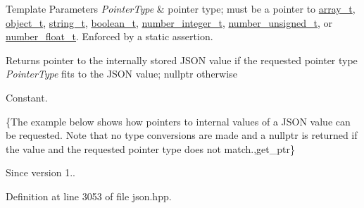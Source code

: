\begin{DoxyTemplParams}{Template Parameters}
{\em Pointer\+Type} & pointer type; must be a pointer to \hyperlink{classnlohmann_1_1basic__json_ab00b882d39306d663c23dab110f5cae0}{array\+\_\+t}, \hyperlink{classnlohmann_1_1basic__json_a0ac9894c9de8dc551cf2e5f1c605537f}{object\+\_\+t}, \hyperlink{classnlohmann_1_1basic__json_ab63e618bbb0371042b1bec17f5891f42}{string\+\_\+t}, \hyperlink{classnlohmann_1_1basic__json_af3bc3e83aa162d7ba4df16a949872723}{boolean\+\_\+t}, \hyperlink{classnlohmann_1_1basic__json_ac4b10b2364f26ce47bdb9a413ff04a59}{number\+\_\+integer\+\_\+t}, \hyperlink{classnlohmann_1_1basic__json_a60a04166c122072ab11eaf9845d9cd1d}{number\+\_\+unsigned\+\_\+t}, or \hyperlink{classnlohmann_1_1basic__json_a74a0013e847fdc574b48f931f0e757e1}{number\+\_\+float\+\_\+t}. Enforced by a static assertion.\\
\hline
\end{DoxyTemplParams}
\begin{DoxyReturn}{Returns}
pointer to the internally stored J\+S\+O\+N value if the requested pointer type {\itshape Pointer\+Type} fits to the J\+S\+O\+N value; {\ttfamily nullptr} otherwise
\end{DoxyReturn}
Constant.

\{The example below shows how pointers to internal values of a J\+S\+O\+N value can be requested. Note that no type conversions are made and a {\ttfamily nullptr} is returned if the value and the requested pointer type does not match.,get\+\_\+ptr\}

\begin{DoxySince}{Since}
version 1.. 
\end{DoxySince}


Definition at line 3053 of file json.\+hpp.

\hypertarget{classnlohmann_1_1basic__json_a4f332e90f3cae562d0c3fa6ba48f74f9}{}
